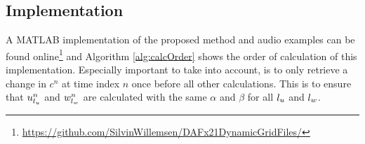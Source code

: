 \subsection{Implementation}
A MATLAB implementation of the proposed method and audio examples can be found online\footnote{\href{https://github.com/SilvinWillemsen/DAFx21DynamicGridFiles/}{https://github.com/SilvinWillemsen/DAFx21DynamicGridFiles/}} and Algorithm \ref{alg:calcOrder} shows the order of calculation of this implementation. Especially important to take into account, is to only retrieve a change in $c^n$ at time index $n$ once before all other calculations. This is to ensure that $u_{l_u}^n$ and $w_{l_w}^n$ are calculated with the same $\alpha$ and $\beta$ for all ${l_u}$ and ${l_w}$.
\begin{algorithm}[ht]
\end{algorithm}
